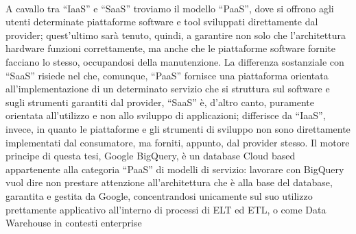 \documentclass[a4paper,12pt]{report}
\begin{document}
\\[0ex]
A cavallo tra “IaaS” e “SaaS” troviamo il modello “PaaS”, dove si offrono agli utenti determinate piattaforme software e tool sviluppati direttamente dal provider; quest’ultimo sarà tenuto, quindi, a garantire non solo che l’architettura hardware funzioni correttamente, ma anche che le piattaforme software fornite facciano lo stesso, occupandosi della manutenzione. La differenza sostanziale con “SaaS” risiede nel che, comunque, “PaaS” fornisce una piattaforma orientata all’implementazione di un determinato servizio che si struttura sul software e sugli strumenti garantiti dal provider, “SaaS” è, d’altro canto, puramente orientata all’utilizzo e non allo sviluppo di applicazioni; differisce da “IaaS”, invece, in quanto le piattaforme e gli strumenti di sviluppo non sono direttamente implementati dal consumatore, ma forniti, appunto, dal provider stesso. Il motore principe di questa tesi, Google BigQuery, è un database Cloud based appartenente alla categoria “PaaS” di modelli di servizio: lavorare con BigQuery vuol dire non prestare attenzione all’architettura che è alla base del database, garantita e gestita da Google, concentrandosi unicamente sul suo utilizzo prettamente applicativo all’interno di processi di ELT ed ETL, o come Data Warehouse in contesti enterprise
\end{document}
